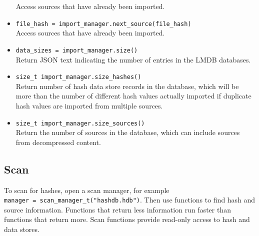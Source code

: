\documentclass[11pt,fleqn]{article} %
\begin{document}
\begin{itemize}
Access sources that have already been imported.
\item \verb+file_hash = import_manager.next_source(file_hash)+\\
Access sources that have already been imported.
\item \verb+data_sizes = import_manager.size()+\\
Return JSON text indicating the number of entries in the LMDB databases.
\item \verb+size_t import_manager.size_hashes()+\\
Return number of hash data store records in the database, which will be more than the number of different hash values actually imported if duplicate hash values are imported from multiple sources.
\item \verb+size_t import_manager.size_sources()+\\
Return the number of sources in the database, which can include sources from decompressed content.
\end{itemize}

\subsection{Scan}
To scan for hashes, open a scan manager, for example\\
\verb+manager = scan_manager_t("hashdb.hdb")+. Then use functions to find hash and source information. Functions that return less information run faster than functions that return more. Scan functions provide read-only access to hash and data stores.
\end{document}
